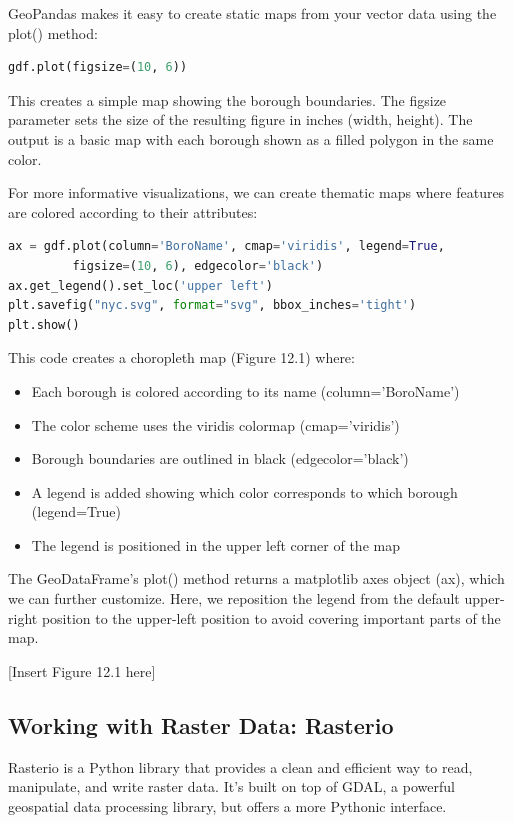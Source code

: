 GeoPandas makes it easy to create static maps from your vector data using the plot() method:

\begin{lstlisting}[language=Python]
gdf.plot(figsize=(10, 6))
\end{lstlisting}

This creates a simple map showing the borough boundaries. The figsize parameter sets the size of the resulting figure in inches (width, height). The output is a basic map with each borough shown as a filled polygon in the same color.

For more informative visualizations, we can create thematic maps where features are colored according to their attributes:

\begin{lstlisting}[language=Python]
ax = gdf.plot(column='BoroName', cmap='viridis', legend=True,
         figsize=(10, 6), edgecolor='black')
ax.get_legend().set_loc('upper left')
plt.savefig("nyc.svg", format="svg", bbox_inches='tight')
plt.show()
\end{lstlisting}

This code creates a choropleth map (Figure 12.1) where:

\begin{itemize}
\item Each borough is colored according to its name (column='BoroName')
\item The color scheme uses the viridis colormap (cmap='viridis')
\item Borough boundaries are outlined in black (edgecolor='black')
\item A legend is added showing which color corresponds to which borough (legend=True)
\item The legend is positioned in the upper left corner of the map
\end{itemize}

The GeoDataFrame's plot() method returns a matplotlib axes object (ax), which we can further customize. Here, we reposition the legend from the default upper-right position to the upper-left position to avoid covering important parts of the map.

[Insert Figure 12.1 here]

\subsection{Working with Raster Data: Rasterio}

Rasterio is a Python library that provides a clean and efficient way to read, manipulate, and write raster data. It's built on top of GDAL, a powerful geospatial data processing library, but offers a more Pythonic interface.

